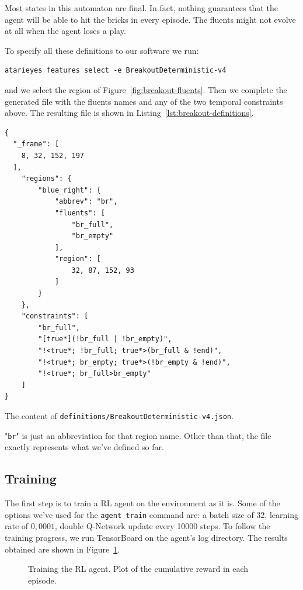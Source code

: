 Most states in this automaton are final. In fact, nothing guarantees that the
agent will be able to hit the bricks in every episode. The fluents might not
evolve at all when the agent loses a play.

To specify all these definitions to our software we run:
\begin{verbatim}
atarieyes features select -e BreakoutDeterministic-v4
\end{verbatim}
and we select the region of Figure~\ref{fig:breakout-fluents}. Then we
complete the generated file with the fluents names and any of the two temporal
constraints above. The resulting file is shown in
Listing~\ref{lst:breakout-definitions}. 
\begin{listing}
\begin{verbatim}
{
  "_frame": [
    8, 32, 152, 197
  ],
	"regions": {
		"blue_right": {
			"abbrev": "br",
			"fluents": [
				"br_full",
				"br_empty"
			],
			"region": [
				32, 87, 152, 93
			]
		}
	},
	"constraints": [
		"br_full",
		"[true*](!br_full | !br_empty)",
		"!<true*; !br_full; true*>(br_full & !end)",
		"!<true*; br_empty; true*>(!br_empty & !end)",
		"!<true*; br_full>br_empty"
	]
}
\end{verbatim}
\caption{The content of \texttt{definitions/BreakoutDeterministic-v4.json}.}
\label{lst:breakout-definitions}
\end{listing}
"\texttt{br}" is just an abbreviation for that region name. Other than that,
the file exactly represents what we've defined so far.


\subsection{Training}

The first step is to train a RL agent on the environment as it is.
Some of the options we've used for the \verb|agent train| command are: a batch
size of 32, learning rate of $0,0001$, double Q-Network update every 10000
steps. To follow the training progress, we run TensorBoard on the agent's log
directory.  The results obtained are shown in
Figure~\ref{fig:breakout-agent-train}.
\begin{figure}
	\centering
	\caption{Training the RL agent. Plot of the cumulative reward in each
	episode.}
	\label{fig:breakout-agent-train}
\end{figure}

